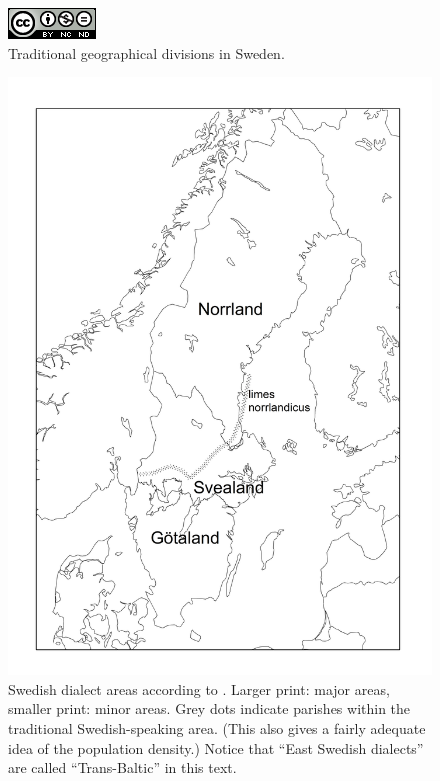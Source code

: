 \begin{figure}[h]

\includegraphics{figures_mod/image1}
\caption{Traditional geographical divisions in Sweden.}
\label{map:1}

\end{figure}

\begin{figure}[h]
\includegraphics{figures_mod/image2}
\caption{Swedish dialect areas according to \citet{Wessén1966}. Larger print: major areas, smaller print: minor areas. Grey dots indicate parishes within the traditional Swedish-speaking area. (This also gives a fairly adequate idea of the population density.) Notice that “East Swedish dialects” are called “Trans-Baltic” in this text.}
\label{map:2}

\end{figure}

